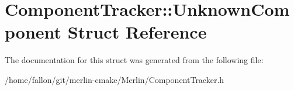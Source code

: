 \hypertarget{structComponentTracker_1_1UnknownComponent}{}\section{Component\+Tracker\+:\+:Unknown\+Component Struct Reference}
\label{structComponentTracker_1_1UnknownComponent}


The documentation for this struct was generated from the following file\+:\begin{DoxyCompactItemize}
\item 
/home/fallon/git/merlin-\/cmake/\+Merlin/Component\+Tracker.\+h\end{DoxyCompactItemize}
